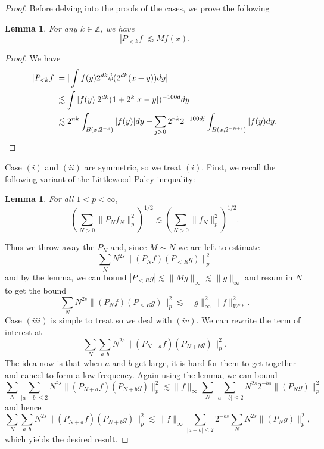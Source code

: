 \documentclass[11pt]{article}
\newtheorem{lem}[thm]{Lemma}
\theoremstyle{remark}
\newcommand{\1}{\textbf{1}}
\newcommand{\lle}{\lesssim}
\def\norm#1{\| #1  \|}
\newcommand{\bbZ}{\mathbb{Z}}
\begin{document}
\begin{enumerate}
\begin{proof}
Before delving into the proofs of the cases, we prove the following
\begin{lem}
For any $k \in \bbZ$, we have
\[
|P_{< k} f| \lle Mf(x).
\]
\end{lem}
\begin{proof}
We have
\begin{align*}
|P_{< k} f|  &= |\int f(y) 2^{dk} \check{\phi}(2^{dk}(x-y)) dy|\\
& \lle \int |f(y)| 2^{dk}(1 + 2^k|x-y|)^{-100d} dy \\
& \lle 2^{nk} \int_{B(x, 2^{-k})}|f(y)| dy + \sum_{j > 0} 2^{nk} 2^{-100dj} \int_{B(x,2^{-k+j})}|f(y) dy. \qedhere
\end{align*}
\end{proof}
Case $(i)$ and $(ii)$ are symmetric, so we treat $(i)$. First, we recall the following variant of the Littlewood-Paley inequality:
\begin{lem}
For all $1 < p < \infty$,
\[
(\sum_{N > 0} \norm{P_N f_N}_p^2)^{1/2} \lle (\sum_{N > 0} \norm{f_N}_p^2)^{1/2}.
\]
\end{lem}
Thus we throw away the $P_N$ and, since $M \sim N$ we are left to estimate
\[
\sum_N N^{2s} \norm{(P_Nf) (P_{< R} g)}^2_p
\]
and by the lemma, we can bound $|P_{< R} g| \lle \norm{Mg}_\infty \lle \norm{g}_\infty$ and resum in $N$ to get the bound
\[
\sum_N N^{2s} \norm{(P_Nf) (P_{< R} g)}^2_p \lle \norm{g}_\infty^2 \norm{f}^2_{W^{s,p}}.
\]
Case $(iii)$ is simple to treat so we deal with $(iv)$. We can rewrite the term of interest at
\[
\sum_N \sum_{a,b} N^{2s} \norm{(P_{N+a}f) (P_{N+b} g)}^2_p.
\]
The idea now is that when $a$ and $b$ get large, it is hard for them to get together and cancel to form a low frequency. Again using the lemma, we can bound
\[
\sum_N \sum_{|a-b| \leq 2} N^{2s} \norm{(P_{N+a}f) (P_{N+b} g)}^2_p \lle \norm{f}_\infty \sum_N \sum_{|a-b| \leq 2} N^{2s} 2^{-bs} \norm{(P_{N} g)}^2_p 
\]
and hence
\[
\sum_N \sum_{a,b} N^{2s} \norm{(P_{N+a}f) (P_{N+b} g)}^2_p \lle \norm{f}_\infty \sum_{|a-b| \leq 2}  2^{-bs} \sum_N N^{2s} \norm{(P_{N} g)}^2_p ,
\]
which yields the desired result.

\end{proof}
\end{enumerate}
\end{document}
